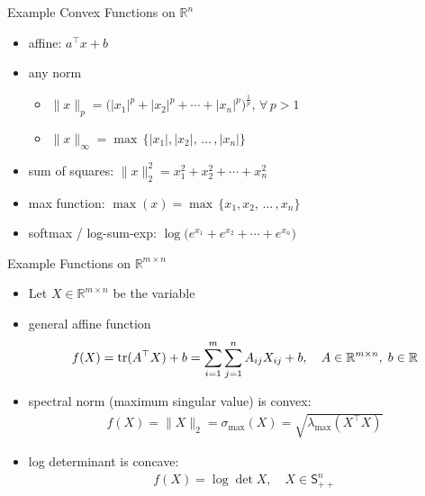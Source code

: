 \documentclass[10pt]{beamer}
\newcommand{\ds}{\displaystyle}
\DeclareMathOperator*{\tr}{tr}
\theoremstyle{definition}
\def\tr{\mathop{\rm tr}}
\begin{document}
\begin{frame}{Example Convex Functions on $\mathbb{R}^n$}
  \begin{itemize}
    \item affine: $\ds a^\top\!x + b$
    \item any norm 
      \begin{itemize}
        \item $\ds\|x\|_p = \big(|x_1|^p + |x_2|^p + \cdots + |x_n|^p\big)^{\frac{1}{p}}$, $\forall\,p > 1$
        \item $\ds\|x\|_\infty = \max\,\{|x_1|, |x_2|,\,\ldots\,,|x_n|\}$
      \end{itemize}
    \item sum of squares: $\ds\|x\|_2^2 = x_1^2 + x_2^2 + \cdots + x_n^2$
    \item max function: $\ds\max(x) = \max\,\{x_1, x_2,\,\ldots\,,x_n\}$
    \item softmax / log-sum-exp: $\ds\log\big(e^{x_1} + e^{x_2} + \cdots + e^{x_n}\big)$
  \end{itemize}
\end{frame}

\begin{frame}{Example Functions on $\mathbb{R}^{m\times n}$}
  \begin{itemize}
    \item Let $\ds X\in\mathbb{R}^{m\times n}$ be the variable
    \item general affine function
      \begin{align*}
        f(X) = \tr(A^\top X) + b = \sum_{i=1}^m\sum_{j=1}^n A_{ij} X_{ij} + b, \quad A\in\mathbb{R}^{m\times n},\;b\in\mathbb{R}
      \end{align*}
    \item spectral norm (maximum singular value) is convex: 
      \begin{align*}
        f(X) = \|X\|_2 = \sigma_{\text{max}}(X) = \sqrt{\lambda_{\text{max}}(X^\top X)}
      \end{align*}
    \item log determinant is concave:
      \begin{align*}
        f(X) = \log\det X, \quad X\in\mathsf{S}^n_{++}
      \end{align*}
  \end{itemize}
\end{frame}
\end{document}
